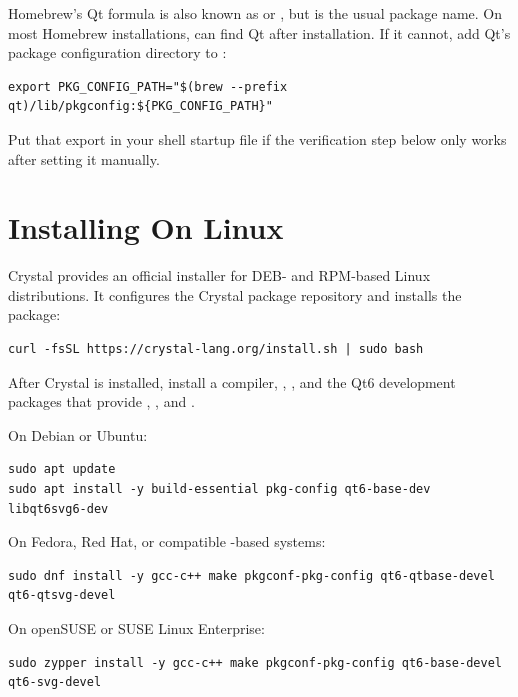 Homebrew's Qt formula is also known as  or , but  is the usual package name. On most Homebrew installations,  can find Qt after installation. If it cannot, add Qt's package configuration directory to :

\begin{lstlisting}[style=crystal]
export PKG_CONFIG_PATH="$(brew --prefix qt)/lib/pkgconfig:${PKG_CONFIG_PATH}"
\end{lstlisting}

Put that export in your shell startup file if the verification step below only works after setting it manually.

\section{Installing On Linux}

Crystal provides an official installer for DEB- and RPM-based Linux distributions. It configures the Crystal package repository and installs the  package:

\begin{lstlisting}[style=crystal]
curl -fsSL https://crystal-lang.org/install.sh | sudo bash
\end{lstlisting}

After Crystal is installed, install a compiler, , , and the Qt6 development packages that provide , , and .

On Debian or Ubuntu:

\begin{lstlisting}[style=crystal]
sudo apt update
sudo apt install -y build-essential pkg-config qt6-base-dev libqt6svg6-dev
\end{lstlisting}

On Fedora, Red Hat, or compatible -based systems:

\begin{lstlisting}[style=crystal]
sudo dnf install -y gcc-c++ make pkgconf-pkg-config qt6-qtbase-devel qt6-qtsvg-devel
\end{lstlisting}

On openSUSE or SUSE Linux Enterprise:

\begin{lstlisting}[style=crystal]
sudo zypper install -y gcc-c++ make pkgconf-pkg-config qt6-base-devel qt6-svg-devel
\end{lstlisting}


